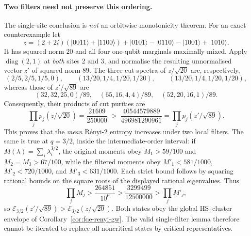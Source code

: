\paragraph{Two filters need not preserve this ordering.}
The single-site conclusion is \emph{not} an orbitwise
monotonicity theorem. For an exact counterexample let
\[
z=(2+2i)(|0011\rangle+|1100\rangle)
 +|0101\rangle-|0110\rangle-|1001\rangle+|1010\rangle.
\]
It has squared norm $20$ and all four one-qubit marginals
maximally mixed. Apply $\operatorname{diag}(2,1)$ at
\emph{both} sites 2 and 3, and normalise the resulting
unnormalised vector $z'$ of squared norm $89$.
The three cut spectra of $z/\sqrt{20}$ are, respectively,
\[
(2/5,2/5,1/5,0),\qquad
(13/20,1/4,1/20,1/20),\qquad
(13/20,1/4,1/20,1/20),
\]
whereas those of $z'/\sqrt{89}$ are
\[
(32,32,25,0)/89,\quad
(65,16,4,4)/89,\quad
(52,20,16,1)/89.
\]
Consequently, their products of cut purities are
\[
\prod_jp_j(z/\sqrt{20})=\frac{21609}{250000}
\;>\;
\frac{40544579889}{496981290961}
=\prod_jp_j(z'/\sqrt{89}).
\tag{FN}\label{eq:fqe-filter-nogo}
\]
This proves that the \emph{mean} R\'enyi-2 entropy increases
under two local filters. The same is true at $q=3/2$, inside
the intermediate-order interval: if $M(\lambda)=\sum_i\lambda_i^{3/2}$,
the original moments obey $M_1>59/100$ and
$M_2=M_3>67/100$, while the filtered moments obey
$M'_1<581/1000$, $M'_2<720/1000$, and $M'_3<631/1000$.
Each strict bound follows by squaring rational bounds on the
square roots of the displayed rational eigenvalues. Thus
\[
\prod_jM_j>\frac{264851}{10^6}>
\frac{3299499}{12500000}>\prod_jM'_j,
\]
so $\mathcal E_{3/2}(z'/\sqrt{89})
>\mathcal E_{3/2}(z/\sqrt{20})$.
Both states obey the global HS--cluster envelope of Corollary~\ref{cor:fqe-renyi-gw}.
The valid single-filter lemma therefore cannot be iterated to
replace all noncritical states by critical representatives.
